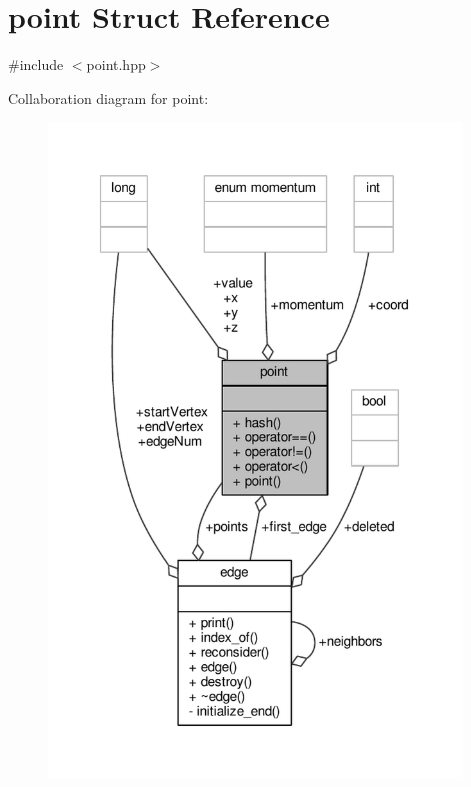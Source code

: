 \hypertarget{classpoint}{\section{point Struct Reference}
\label{classpoint}
}


{\ttfamily \#include $<$point.\-hpp$>$}



Collaboration diagram for point\-:
\nopagebreak
\begin{figure}[H]
\begin{center}
\leavevmode
\includegraphics[width=311pt]{classpoint__coll__graph}
\end{center}
\end{figure}
